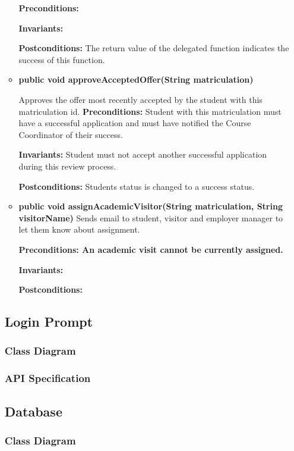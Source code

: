 \documentclass[12pt]{article}
\begin{document}
\begin{itemize}
\begin{itemize}
{\textbf{Preconditions:} 

\textbf{Invariants:}

\textbf{Postconditions:} The return value of the delegated function indicates
the success of this function.}

\item{\textbf{public void approveAcceptedOffer(String matriculation)}

Approves the offer most recently accepted by the student with this matriculation
id. 
\textbf{Preconditions:} Student with this matriculation must have a successful
application and must have notified the Course Coordinator of their success.

\textbf{Invariants:} Student must not accept another successful application
during this review process.

\textbf{Postconditions:} Students status is changed to a success status.}

\item{\textbf{public void assignAcademicVisitor(String matriculation, String
    visitorName)}
Sends email to student, visitor and employer manager to let them know about
assignment. 

\textbf{Preconditions: An academic visit cannot be currently assigned.}

\textbf{Invariants:} 

\textbf{Postconditions:} }

\end{itemize}
\subsection{Login Prompt}

\subsubsection{Class Diagram}

\subsubsection{API Specification}

\subsection{Database}

\subsubsection{Class Diagram}


\end{itemize}
\end{document}
